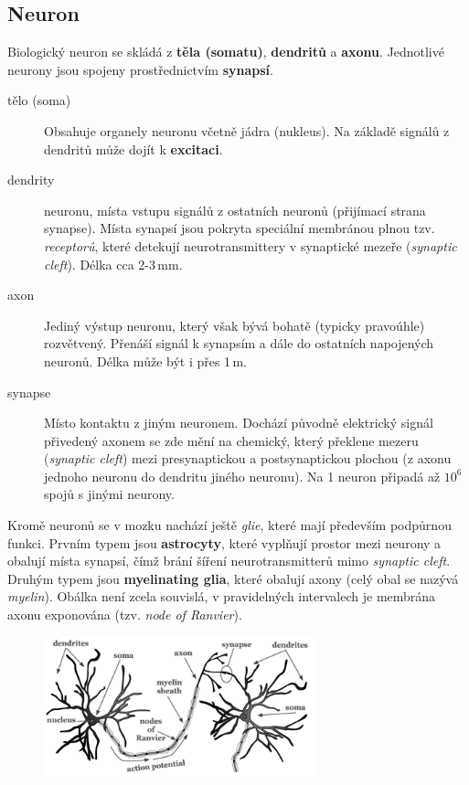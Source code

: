 \documentclass[11pt]{report} %
\numberwithin{equation}{section}
\begin{document}
\subsection{Neuron}
Biologický neuron se skládá z \textbf{těla (somatu)}, \textbf{dendritů} a \textbf{axonu}. Jednotlivé neurony jsou spojeny prostřednictvím \textbf{synapsí}.
\begin{description}
	
	
	\item[tělo (soma)] Obsahuje organely neuronu včetně jádra (nukleus). Na základě signálů z dendritů může dojít k \textbf{excitaci}.
	\item[dendrity]  neuronu, místa vstupu signálů z ostatních neuronů (přijímací strana synapse). Místa synapsí jsou pokryta speciální membránou plnou tzv. \textit{receptorů}, které detekují neurotransmittery v synaptické mezeře (\textit{synaptic cleft}). Délka cca 2-3\,mm.
	\item[axon] Jediný výstup neuronu, který však bývá bohatě (typicky pravoúhle) rozvětvený. Přenáší signál k synapsím a dále do ostatních napojených neuronů. Délka může být i přes 1\,m.
	\item[synapse] Místo kontaktu z jiným neuronem. Dochází původně elektrický signál přivedený axonem se zde mění na chemický, který překlene mezeru (\textit{synaptic cleft}) mezi presynaptickou a postsynaptickou plochou (z axonu jednoho neuronu do dendritu jiného neuronu). Na 1 neuron připadá až $10^6$ spojů s jinými neurony.
\end{description}

Kromě neuronů se v mozku nachází ještě \textit{glie}, které mají především podpůrnou funkci. Prvním typem jsou \textbf{astrocyty}, které vyplňují prostor mezi neurony a obalují místa synapsí, čímž brání šíření neurotransmitterů mimo \textit{synaptic cleft}. Druhým typem jsou \textbf{myelinating glia}, které obalují axony (celý obal se nazývá \textit{myelin}). Obálka není zcela souvislá, v pravidelných intervalech je membrána axonu exponována (tzv. \textit{node of Ranvier}).

\begin{figure}[H]
	\centering
	\includegraphics[width=0.7\textwidth]{img/neuron.png}
\end{figure}
\end{document}
